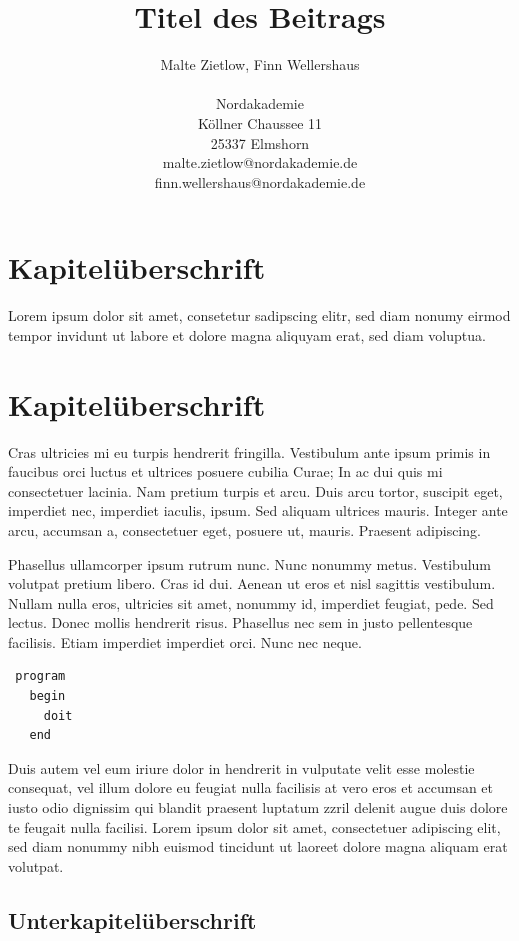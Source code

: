 \documentclass{akdai}
\author{
	Malte Zietlow, Finn Wellershaus \\ 
	\\
	Nordakademie\\ 
	Köllner Chaussee 11\\ 
	25337 Elmshorn \\ 
	malte.zietlow@nordakademie.de \\
	finn.wellershaus@nordakademie.de
}
\title{Titel des Beitrags}
\theoremstyle{definition}
\begin{document}
\maketitle



\section{Kapitelüberschrift}

Lorem ipsum dolor sit amet, consetetur sadipscing elitr, sed diam nonumy eirmod tempor invidunt
ut labore et dolore magna aliquyam erat, sed diam voluptua.

\blindtext[1]

\section{Kapitelüberschrift}

Cras ultricies mi eu turpis hendrerit fringilla. Vestibulum ante ipsum primis in faucibus orci 
luctus et ultrices posuere cubilia Curae; In ac dui quis mi consectetuer lacinia. Nam pretium 
turpis 
et arcu. Duis arcu tortor, suscipit eget, imperdiet nec, imperdiet iaculis, ipsum. Sed aliquam 
ultrices mauris. Integer ante arcu, accumsan a, consectetuer eget, posuere ut, mauris. Praesent 
adipiscing.

Phasellus ullamcorper ipsum rutrum nunc. Nunc nonummy metus. Vestibulum volutpat pretium libero. 
Cras id dui. Aenean ut eros et nisl sagittis vestibulum. Nullam nulla eros, ultricies sit amet, 
nonummy id, imperdiet feugiat, pede. Sed lectus. Donec mollis hendrerit risus. Phasellus nec sem in 
justo pellentesque facilisis. Etiam imperdiet imperdiet orci. Nunc nec neque.
 

\begin{verbatim}
 program
   begin
     doit
   end
\end{verbatim}

Duis autem vel eum iriure dolor in hendrerit in vulputate velit esse molestie consequat, vel illum 
dolore eu feugiat nulla facilisis at vero eros et accumsan et iusto odio dignissim qui blandit 
praesent luptatum zzril delenit augue duis dolore te feugait nulla facilisi. Lorem ipsum dolor sit 
amet, consectetuer adipiscing elit, sed diam nonummy nibh euismod tincidunt ut laoreet dolore magna 
aliquam erat volutpat. 


\subsection{Unterkapitelüberschrift}
\end{document}
